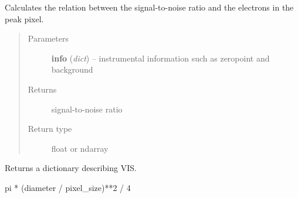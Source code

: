 \documentclass[a4paper,12pt,english]{sphinxmanual}
\begin{document}
\begin{fulllineitems}
\label{analysis:analysis.ETC.SNRproptoPeak}
Calculates the relation between the signal-to-noise ratio and the electrons in the peak pixel.
\begin{quote}\begin{description}
\item[{Parameters}] \leavevmode
\textbf{info} (\emph{dict}) -- instrumental information such as zeropoint and background

\item[{Returns}] \leavevmode
signal-to-noise ratio

\item[{Return type}] \leavevmode
float or ndarray

\end{description}\end{quote}

\end{fulllineitems}


\begin{fulllineitems}
\label{analysis:analysis.ETC.VISinformation}
Returns a dictionary describing VIS.

\end{fulllineitems}


\begin{fulllineitems}
\label{analysis:analysis.ETC.calculateAperture}
pi * (diameter / pixel\_size)**2 / 4

\end{fulllineitems}

\end{document}
